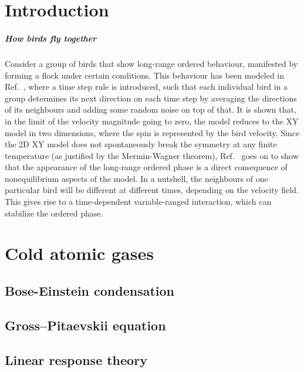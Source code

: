 \chapter{Introduction}%



\paragraph{How birds fly together}%
Consider a group of birds that show long-range ordered behaviour,
manifested by forming a flock under certain conditions. This behaviour
has been modeled in Ref.~\cite{Toner1995}, where a time step rule is
introduced, such that each individual bird in a group determines its
next direction on each time step by averaging the directions of its
neighbours and adding some random noise on top of that. It is shown
that, in the limit of the velocity magnitude going to zero, the model
reduces to the XY model in two dimensions, where the spin is
represented by the bird velocity. Since the 2D XY model does not
spontaneously break the symmetry at any finite temperature (as
justified by the Mermin-Wagner theorem), Ref.~\cite{Toner1995} goes on
to show that the appearance of the long-range ordered phase is a
direct consequence of nonequilibrium aspects of the model. In a
nutshell, the neighbours of one particular bird will be different at
different times, depending on the velocity field. This gives rise to a
time-dependent variable-ranged interaction, which can stabilize the
ordered phase.





\chapter{Cold atomic gases}
\label{cha:cold-gases}

\section{Bose-Einstein condensation}
\label{sec:BEC}

\section{Gross–Pitaevskii equation}
\label{sec:GPE}


\section{Linear response theory}
\label{sec:linear-response}

